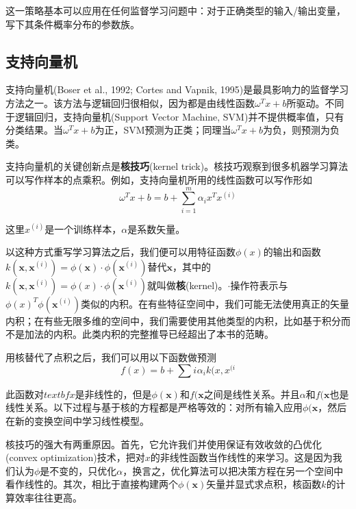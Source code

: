 这一策略基本可以应用在任何监督学习问题中：对于正确类型的输入/输出变量，写下其条件概率分布的参数族。

\subsection{支持向量机}
\label{sec:5.7.2}

支持向量机(Boser et al., 1992; Cortes and Vapnik, 1995)是最具影响力的监督学习方法之一。该方法与逻辑回归很相似，因为都是由线性函数$\omega^{T}x + b$所驱动。不同于逻辑回归，支持向量机(Support Vector Machine, SVM)并不提供概率值，只有分类结果。当$\omega^{T}x + b$为正，SVM预测为正类；同理当$\omega^{T}x + b$为负，则预测为负类。

支持向量机的关键创新点是\textbf{核技巧}(kernel trick)。核技巧观察到很多机器学习算法可以写作样本的点乘积。例如，支持向量机所用的线性函数可以写作形如
\begin{equation}
	\omega^{T}x + b = b + \sum_{i=1}^{m}{\alpha_{i}x^{T} x^{(i)}} 
    \label{form:5.81}
\end{equation}

这里$x^{(i)}$是一个训练样本，$\alpha$是系数矢量。

以这种方式重写学习算法之后，我们便可以用特征函数$\phi(x)$的输出和函数$k(\textbf{x}, \textbf{x}^{(i)})=\phi(\textbf{x})\cdot\phi(\textbf{x}^{(i)})$替代$\textbf{x}$，其中的$k(\textbf{x}, \textbf{x}^{(i)})=\phi(x)\cdot\phi(\textbf{x}^{(i)})$就叫做\textbf{核}(kernel)。$\cdot$操作符表示与$\phi(x)^{T}\phi(\textbf{x}^{(i)})$类似的内积。在有些特征空间中，我们可能无法使用真正的矢量内积；在有些无限多维的空间中，我们需要使用其他类型的内积，比如基于积分而不是加法的内积。此类内积的完整推导已经超出了本书的范畴。

用核替代了点积之后，我们可以用以下函数做预测
\begin{equation}
	f(x) = b + \sum{i}^{}{\alpha_{i}k(x,x^{(i}}
	\label{form:5.82}
\end{equation}

此函数对$textbf{x}$是非线性的，但是$\phi(\textbf{x})$和$f(\textbf{x}$之间是线性关系。并且$\alpha$和$f(\textbf{x}$也是线性关系。以下过程与基于核的方程都是严格等效的：对所有输入应用$\phi(\textbf{x}$，然后在新的变换空间中学习线性模型。

核技巧的强大有两重原因。首先，它允许我们并使用保证有效收敛的凸优化(convex optimization)技术，把对$x$的非线性函数当作线性的来学习。这是因为我们认为$\phi$是不变的，只优化$\alpha$，换言之，优化算法可以把决策方程在另一个空间中看作线性的。其次，相比于直接构建两个$\phi(\textbf{x})$矢量并显式求点积，核函数$k$的计算效率往往更高。

